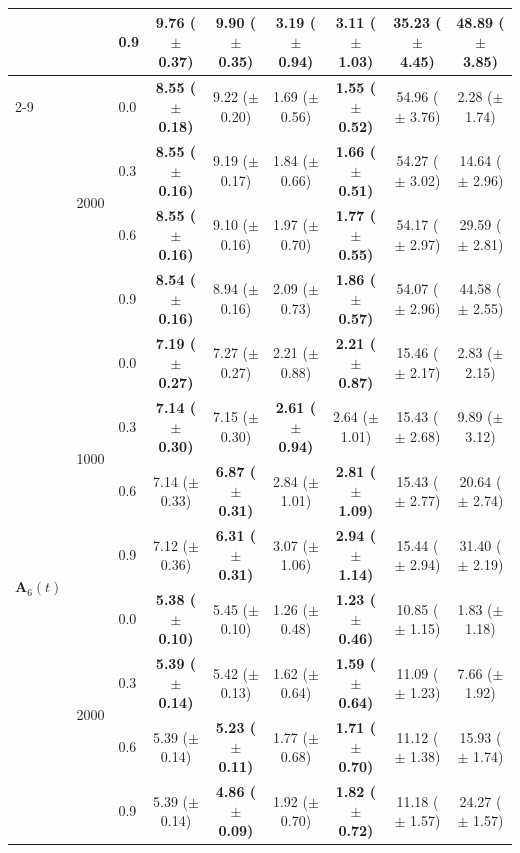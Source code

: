 \begin{table}[htbp]
{\begin{tabular}{lll|cc|cc|cc}
 &  & 0.9 & \textbf{9.76 ($\pm$ 0.37)} & 9.90 ($\pm$ 0.35) & 3.19 ($\pm$ 0.94) & \textbf{3.11 ($\pm$ 1.03)} & 35.23 ($\pm$ 4.45) & 48.89 ($\pm$ 3.85) \\
\cline{2-9}
 & \multirow{4}{*}{2000} & 0.0 & \textbf{8.55 ($\pm$ 0.18)} & 9.22 ($\pm$ 0.20) & 1.69 ($\pm$ 0.56) & \textbf{1.55 ($\pm$ 0.52)} & 54.96 ($\pm$ 3.76) & 2.28 ($\pm$ 1.74) \\
 &  & 0.3 & \textbf{8.55 ($\pm$ 0.16)} & 9.19 ($\pm$ 0.17) & 1.84 ($\pm$ 0.66) & \textbf{1.66 ($\pm$ 0.51)} & 54.27 ($\pm$ 3.02) & 14.64 ($\pm$ 2.96) \\
 &  & 0.6 & \textbf{8.55 ($\pm$ 0.16)} & 9.10 ($\pm$ 0.16) & 1.97 ($\pm$ 0.70) & \textbf{1.77 ($\pm$ 0.55)} & 54.17 ($\pm$ 2.97) & 29.59 ($\pm$ 2.81) \\
 &  & 0.9 & \textbf{8.54 ($\pm$ 0.16)} & 8.94 ($\pm$ 0.16) & 2.09 ($\pm$ 0.73) & \textbf{1.86 ($\pm$ 0.57)} & 54.07 ($\pm$ 2.96) & 44.58 ($\pm$ 2.55) \\
\hline
\multirow{8}{*}{$\mathbf{A}_6(t)$} & \multirow{4}{*}{1000} & 0.0 & \textbf{7.19 ($\pm$ 0.27)} & 7.27 ($\pm$ 0.27) & 2.21 ($\pm$ 0.88) & \textbf{2.21 ($\pm$ 0.87)} & 15.46 ($\pm$ 2.17) & 2.83 ($\pm$ 2.15) \\
 &  & 0.3 & \textbf{7.14 ($\pm$ 0.30)} & 7.15 ($\pm$ 0.30) & \textbf{2.61 ($\pm$ 0.94)} & 2.64 ($\pm$ 1.01) & 15.43 ($\pm$ 2.68) & 9.89 ($\pm$ 3.12) \\
 &  & 0.6 & 7.14 ($\pm$ 0.33) & \textbf{6.87 ($\pm$ 0.31)} & 2.84 ($\pm$ 1.01) & \textbf{2.81 ($\pm$ 1.09)} & 15.43 ($\pm$ 2.77) & 20.64 ($\pm$ 2.74) \\
 &  & 0.9 & 7.12 ($\pm$ 0.36) & \textbf{6.31 ($\pm$ 0.31)} & 3.07 ($\pm$ 1.06) & \textbf{2.94 ($\pm$ 1.14)} & 15.44 ($\pm$ 2.94) & 31.40 ($\pm$ 2.19) \\
\cline{2-9}
 & \multirow{4}{*}{2000} & 0.0 & \textbf{5.38 ($\pm$ 0.10)} & 5.45 ($\pm$ 0.10) & 1.26 ($\pm$ 0.48) & \textbf{1.23 ($\pm$ 0.46)} & 10.85 ($\pm$ 1.15) & 1.83 ($\pm$ 1.18) \\
 &  & 0.3 & \textbf{5.39 ($\pm$ 0.14)} & 5.42 ($\pm$ 0.13) & 1.62 ($\pm$ 0.64) & \textbf{1.59 ($\pm$ 0.64)} & 11.09 ($\pm$ 1.23) & 7.66 ($\pm$ 1.92) \\
 &  & 0.6 & 5.39 ($\pm$ 0.14) & \textbf{5.23 ($\pm$ 0.11)} & 1.77 ($\pm$ 0.68) & \textbf{1.71 ($\pm$ 0.70)} & 11.12 ($\pm$ 1.38) & 15.93 ($\pm$ 1.74) \\
 &  & 0.9 & 5.39 ($\pm$ 0.14) & \textbf{4.86 ($\pm$ 0.09)} & 1.92 ($\pm$ 0.70) & \textbf{1.82 ($\pm$ 0.72)} & 11.18 ($\pm$ 1.57) & 24.27 ($\pm$ 1.57) \\
\hline
\end{tabular}%
}
\end{table}
